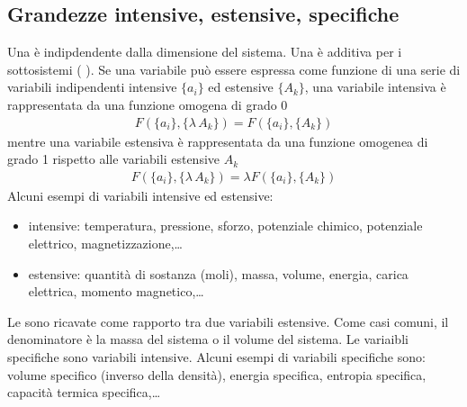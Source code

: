 \documentclass[letterpaper,10pt,italian]{jupyterBook}
\begin{document}
\subsection{Grandezze intensive, estensive, specifiche}
\label{\detokenize{ch/thermodynamics/foundation-vocabulary:grandezze-intensive-estensive-specifiche}}
\sphinxAtStartPar
Una  è indipdendente dalla dimensione del sistema. Una  è additiva per i sottosistemi ( ). Se una variabile può essere espressa come funzione di una serie di variabili indipendenti intensive \(\{a_i\}\) ed estensive \(\{A_k\}\), una variabile intensiva è rappresentata da una funzione omogena di grado 0
\begin{equation*}
\begin{split}F(\{a_i\},\{\lambda \, A_k\}) = F(\{a_i\}, \{A_k\})\end{split}
\end{equation*}
\sphinxAtStartPar
mentre una variabile estensiva è rappresentata da una funzione omogenea di grado 1 rispetto alle variabili estensive \(A_k\)
\begin{equation*}
\begin{split}F(\{a_i\},\{\lambda \, A_k\}) = \lambda F(\{a_i\}, \{A_k\})\end{split}
\end{equation*}
\sphinxAtStartPar
Alcuni esempi di variabili intensive ed estensive:
\begin{itemize}
\item {} 
\sphinxAtStartPar
intensive: temperatura, pressione, sforzo, potenziale chimico, potenziale elettrico, magnetizzazione,…

\item {} 
\sphinxAtStartPar
estensive: quantità di sostanza (moli), massa, volume, energia, carica elettrica, momento magnetico,…

\end{itemize}

\sphinxAtStartPar
Le  sono ricavate come rapporto tra due variabili estensive. Come casi comuni, il denominatore è la massa del sistema o il volume del sistema. Le variaibli specifiche sono variabili intensive. Alcuni esempi di variabili specifiche sono: volume specifico (inverso della densità), energia specifica, entropia specifica, capacità termica specifica,…
\end{document}
